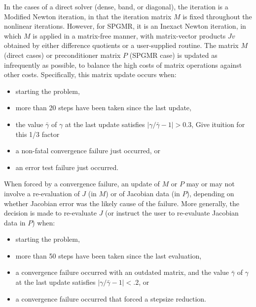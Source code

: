 In the cases of a direct solver (dense, band, or diagonal), the
iteration is a Modified Newton iteration, in that the iteration matrix
$M$ is fixed throughout the nonlinear iterations.  However, for SPGMR,
it is an Inexact Newton iteration, in which $M$ is applied in a
matrix-free manner, with matrix-vector products $Jv$ obtained by
either difference quotients or a user-supplied routine.  The matrix
$M$ (direct cases) or preconditioner matrix $P$ (SPGMR case) is
updated as infrequently as possible, to balance the high costs of
matrix operations against other costs.  Specifically, this matrix
update occurs when:
\begin{itemize}
\item starting the problem,
\item more than 20 steps have been taken since the last update,
\item the value $\bar{\gamma}$ of $\gamma$ at the last update
satisfies $|\gamma/\bar{\gamma} - 1| > 0.3$,  {\sf Give ituition for this 1/3 factor}
\item a non-fatal convergence failure just occurred, or
\item an error test failure just occurred.
\end{itemize}
When forced by a convergence failure, an update of $M$ or $P$ may or
may not involve a re-evaluation of $J$ (in $M$) or of Jacobian data
(in $P$), depending on whether Jacobian error was the likely cause of
the failure.  More generally, the decision is made to re-evaluate $J$
(or instruct the user to re-evaluate Jacobian data in $P$) when:
\begin{itemize}
\item starting the problem,
\item more than 50 steps have been taken since the last evaluation,
\item a convergence failure occurred with an outdated matrix, and
the value $\bar{\gamma}$ of $\gamma$ at the last update
satisfies $|\gamma/\bar{\gamma} - 1| < .2$, or
\item a convergence failure occurred that forced a stepsize reduction.
\end{itemize}

